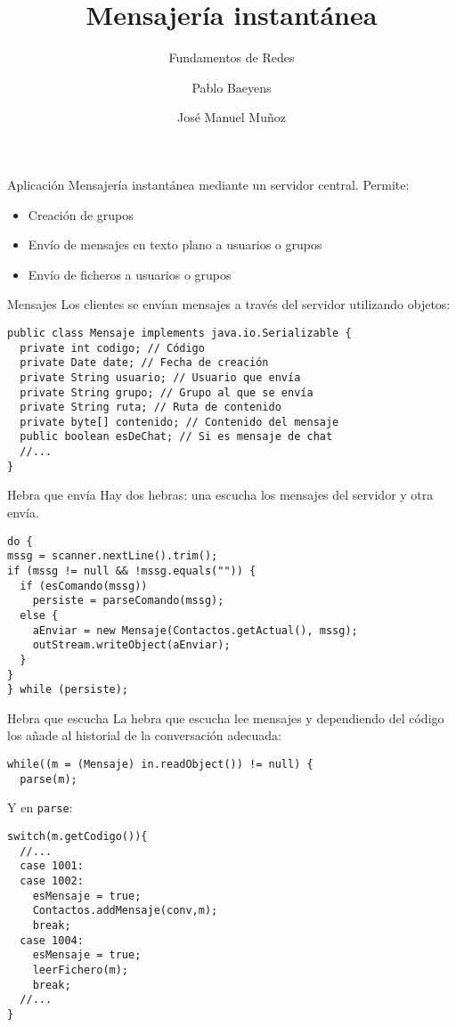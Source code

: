 \documentclass[compress]{beamer}
\title{Mensajería instantánea}
\subtitle{Fundamentos de Redes}
\author{Pablo Baeyens \and José Manuel Muñoz}
\date{}
\begin{document}
\begin{frame}
\titlepage
\end{frame}

\begin{frame}[fragile]{Aplicación}
  Mensajería instantánea mediante un servidor central. Permite:

  \begin{itemize}
    \item Creación de grupos
    \item Envío de mensajes en texto plano a usuarios o grupos
    \item Envío de ficheros a usuarios o grupos
  \end{itemize}
\end{frame}

\begin{frame}[fragile]{Mensajes}
  Los clientes se envían mensajes a través del servidor utilizando objetos:

\begin{lstlisting}
public class Mensaje implements java.io.Serializable {
  private int codigo; // Código
  private Date date; // Fecha de creación
  private String usuario; // Usuario que envía
  private String grupo; // Grupo al que se envía
  private String ruta; // Ruta de contenido
  private byte[] contenido; // Contenido del mensaje
  public boolean esDeChat; // Si es mensaje de chat
  //...
}
\end{lstlisting}
\end{frame}

\begin{frame}[fragile]{Hebra que envía}
  Hay dos hebras: una escucha los mensajes del servidor y otra envía.
\begin{lstlisting}
do {
mssg = scanner.nextLine().trim();
if (mssg != null && !mssg.equals("")) {
  if (esComando(mssg))
    persiste = parseComando(mssg);
  else {
    aEnviar = new Mensaje(Contactos.getActual(), mssg);
    outStream.writeObject(aEnviar);
  }
}
} while (persiste);
\end{lstlisting}
\end{frame}

\begin{frame}[fragile]{Hebra que escucha}
  La hebra que escucha lee mensajes y dependiendo del código los añade al historial de la conversación adecuada:
\begin{lstlisting}
while((m = (Mensaje) in.readObject()) != null) {
  parse(m);
\end{lstlisting}

Y en \texttt{parse}:

\begin{lstlisting}
switch(m.getCodigo()){
  //...
  case 1001:
  case 1002:
    esMensaje = true;
    Contactos.addMensaje(conv,m);
    break;
  case 1004:
    esMensaje = true;
    leerFichero(m);
    break;
  //...
}
\end{lstlisting}
\end{frame}
\end{document}
